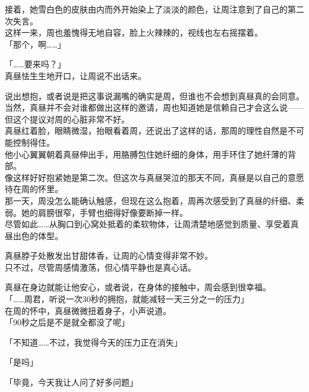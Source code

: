 接着，她雪白色的皮肤由内而外开始染上了淡淡的颜色，让周注意到了自己的第二次失言。\\

这样一来，周也羞愧得无地自容，脸上火辣辣的，视线也左右摇摆着。\\

「那个，啊……」

「……要来吗？」\\

真昼怯生生地开口，让周说不出话来。

说出想抱，或者说是把这事说漏嘴的确实是周，但谁也不会想到真昼真的会同意。\\

当然，真昼并不会对谁都做出这样的邀请，周也知道她是信赖自己才会这么说——但这个提议对周的心脏非常不好。\\

真昼红着脸，眼睛微湿，抬眼看着周，还说出了这样的话，那周的理性自然是不可能控制得住。\\

他小心翼翼朝着真昼伸出手，用胳膊包住她纤细的身体，用手环住了她纤薄的背部。\\

像这样好好抱紧她是第二次。但这次与真昼哭泣的那天不同，真昼是以自己的意愿待在周的怀里。\\

那一天，周没怎么能确认触感，但现在这么抱着，周再次感受到了真昼的纤细、柔弱。她的肩膀很窄，手臂也细得好像要断掉一样。\\

尽管如此……从胸口到心窝处抵着的柔软物体，让周清楚地感觉到质量、享受着真昼出色的体型。

真昼脖子处散发出甘甜体香，让周的心情变得非常不妙。\\

只不过，尽管周感情激荡，但心情平静也是真心话。

真昼在身边就能让他安心，或者说，在身体的接触中，周会感到很幸福。\\

「……周君，听说一次30秒的拥抱，就能减轻一天三分之一的压力」\\

在周的怀中，真昼微微扭着身子，小声说道。\\

「90秒之后是不是就全都没了呢」

「不知道……不过，我觉得今天的压力正在消失」

「是吗」

「毕竟，今天我让人问了好多问题」\\

